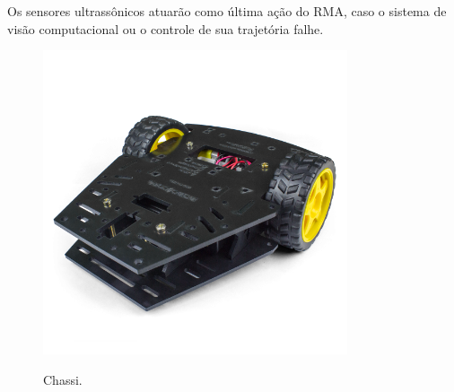 Os sensores ultrassônicos atuarão como última ação do RMA, caso o sistema de visão computacional ou o controle de sua trajetória falhe.

\begin{figure}[!hbtp]
  \centering
   \caption{Chassi.}
    \includegraphics[width = 0.8\textwidth]{Caps/Figs/resultados/582_1_H.png}
   \label{fig:chassi}
\end{figure}